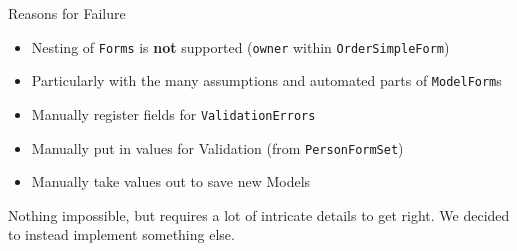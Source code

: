 \begin{frame}[c]{Reasons for Failure}
    \large
    \begin{itemize}[<+(1)->]
        \item Nesting of \texttt{Forms} is \textbf{not} supported (\texttt{owner} within \texttt{OrderSimpleForm})
        \item Particularly with the many assumptions and automated parts of \texttt{ModelForm}s
        \item Manually register fields for \texttt{ValidationErrors}
        \item Manually put in values for Validation (from \texttt{PersonFormSet})
        \item Manually take values out to save new Models
    \end{itemize}
    \pause
    Nothing impossible, but requires a lot of intricate details to get right.
    \pause
    We decided to instead implement something else.
\end{frame}


